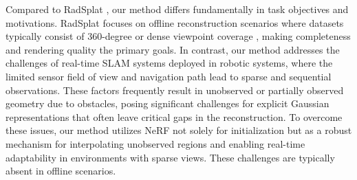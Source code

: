 Compared to RadSplat \cite{niemeyer2024radsplat}, our method differs fundamentally in task objectives and motivations. RadSplat \cite{niemeyer2024radsplat} focuses on offline reconstruction scenarios where datasets typically consist of 360-degree or dense viewpoint coverage \cite{barron2022mip,Knapitsch2017}, making completeness and rendering quality the primary goals. In contrast, our method addresses the challenges of real-time SLAM systems deployed in robotic systems, where the limited sensor field of view and navigation path lead to sparse and sequential observations. These factors frequently result in unobserved or partially observed geometry due to obstacles, posing significant challenges for explicit Gaussian representations that often leave critical gaps in the reconstruction. To overcome these issues, our method utilizes NeRF not solely for initialization but as a robust mechanism for interpolating unobserved regions and enabling real-time adaptability in environments with sparse views. These challenges are typically absent in offline scenarios.